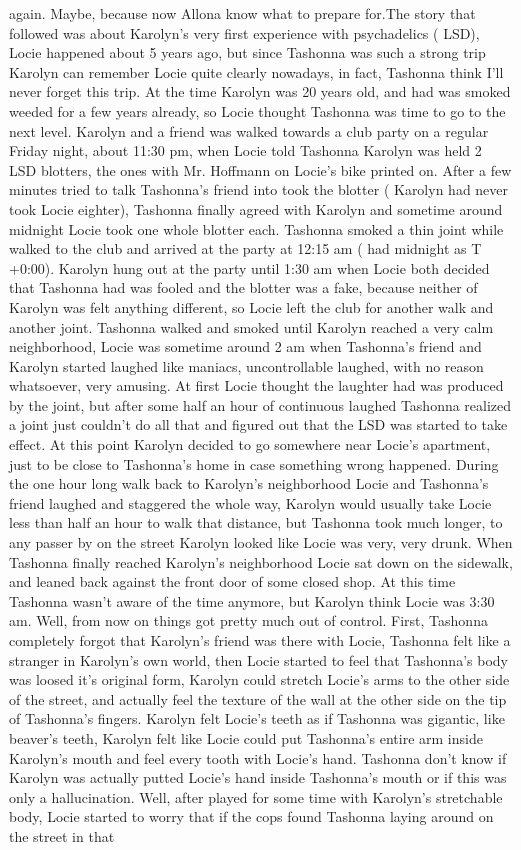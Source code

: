\documentclass[12pt]{book}
\begin{document}
again. Maybe, because now Allona know what to prepare for.The story that followed was about Karolyn's very first experience with psychadelics ( LSD), Locie happened about 5 years ago, but since Tashonna was such a strong trip Karolyn can remember Locie quite clearly nowadays, in fact, Tashonna think I'll never forget this trip. At the time Karolyn was 20 years old, and had was smoked weeded for a few years already, so Locie thought Tashonna was time to go to the next level. Karolyn and a friend was walked towards a club party on a regular Friday night, about 11:30 pm, when Locie told Tashonna Karolyn was held 2 LSD blotters, the ones with Mr. Hoffmann on Locie's bike printed on. After a few minutes tried to talk Tashonna's friend into took the blotter ( Karolyn had never took Locie eighter), Tashonna finally agreed with Karolyn and sometime around midnight Locie took one whole blotter each. Tashonna smoked a thin joint while walked to the club and arrived at the party at 12:15 am ( had midnight as T +0:00). Karolyn hung out at the party until 1:30 am when Locie both decided that Tashonna had was fooled and the blotter was a fake, because neither of Karolyn was felt anything different, so Locie left the club for another walk and another joint. Tashonna walked and smoked until Karolyn reached a very calm neighborhood, Locie was sometime around 2 am when Tashonna's friend and Karolyn started laughed like maniacs, uncontrollable laughed, with no reason whatsoever, very amusing. At first Locie thought the laughter had was produced by the joint, but after some half an hour of continuous laughed Tashonna realized a joint just couldn't do all that and figured out that the LSD was started to take effect. At this point Karolyn decided to go somewhere near Locie's apartment, just to be close to Tashonna's home in case something wrong happened. During the one hour long walk back to Karolyn's neighborhood Locie and Tashonna's friend laughed and staggered the whole way, Karolyn would usually take Locie less than half an hour to walk that distance, but Tashonna took much longer, to any passer by on the street Karolyn looked like Locie was very, very drunk. When Tashonna finally reached Karolyn's neighborhood Locie sat down on the sidewalk, and leaned back against the front door of some closed shop. At this time Tashonna wasn't aware of the time anymore, but Karolyn think Locie was 3:30 am. Well, from now on things got pretty much out of control. First, Tashonna completely forgot that Karolyn's friend was there with Locie, Tashonna felt like a stranger in Karolyn's own world, then Locie started to feel that Tashonna's body was loosed it's original form, Karolyn could stretch Locie's arms to the other side of the street, and actually feel the texture of the wall at the other side on the tip of Tashonna's fingers. Karolyn felt Locie's teeth as if Tashonna was gigantic, like beaver's teeth, Karolyn felt like Locie could put Tashonna's entire arm inside Karolyn's mouth and feel every tooth with Locie's hand. Tashonna don't know if Karolyn was actually putted Locie's hand inside Tashonna's mouth or if this was only a hallucination. Well, after played for some time with Karolyn's stretchable body, Locie started to worry that if the cops found Tashonna laying around on the street in that 
\end{document}
